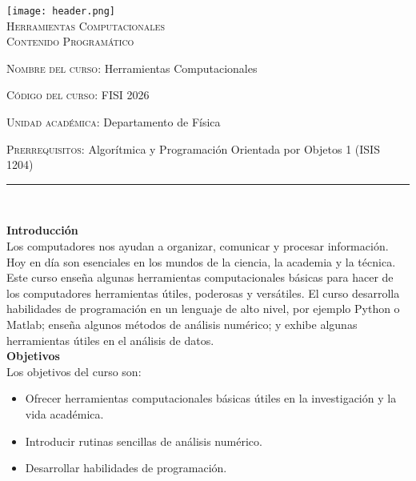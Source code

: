 \documentclass[letterpaper,10pt,onecolumn]{article}
\begin{document}
\begin{center}

\texttt{[image: header.png]}\\[0.5cm]

\textsc{\huge Herramientas Computacionales}\\[0.1cm]

\Large \textsc{Contenido Programático}\\[0.7cm]

\end{center}

\large \noindent\textsc{Nombre del curso:} Herramientas Computacionales
	 
\noindent\textsc{Código del curso:} FISI 2026

\noindent\textsc{Unidad académica:} Departamento de Física

\noindent\textsc{Prerrequisitos:} Algorítmica y Programación Orientada por Objetos 1 (ISIS 1204)

\noindent\rule{\textwidth}{1pt}\\[-0.1cm]

\addtocounter{mysection}{1}

\noindent\textbf{\large {} \quad Introducción}\\[-0.2cm]

\noindent\normalsize Los computadores nos ayudan a organizar,
comunicar y procesar información.
Hoy en día son esenciales en los mundos de la ciencia, la academia y
la técnica. 
Este curso enseña algunas herramientas computacionales básicas para
hacer de los computadores herramientas útiles, poderosas y
versátiles. 
El curso desarrolla habilidades de programación en un lenguaje de alto
nivel, por ejemplo Python o Matlab; enseña algunos métodos de análisis
numérico; y exhibe algunas herramientas útiles en el análisis de 
datos. \\[0.1cm] 

\noindent\textbf{\large {} \quad Objetivos}\\[-0.2cm]

\noindent\normalsize Los objetivos del curso son:

\begin{itemize}
	\item Ofrecer herramientas computacionales básicas útiles en la investigación y la vida académica.\\[-0.6cm]
	\item Introducir rutinas sencillas de análisis numérico.\\[-0.6cm]
	\item Desarrollar habilidades de programación.\\[-0.2cm]
\end{itemize}
\end{document}
